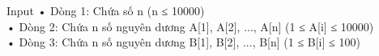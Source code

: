 Input
• Dòng 1: Chứa số n (n ≤ 10000)
\\• Dòng 2: Chứa n số nguyên dương A[1], A[2], ..., A[n] (1 ≤ A[i] ≤ 10000)
\\• Dòng 3: Chứa n số nguyên dương B[1], B[2], ..., B[n] (1 ≤ B[i] ≤ 100)